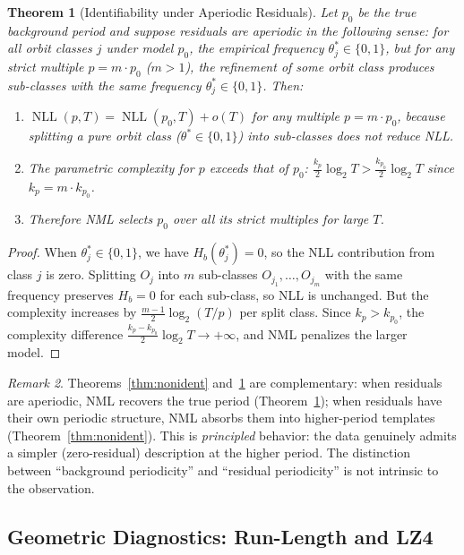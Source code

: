 \documentclass[11pt]{article}
\newtheorem{theorem}{Theorem}
\theoremstyle{definition}
\theoremstyle{remark}
\newtheorem{remark}[theorem]{Remark}
\newcommand{\NLL}{\operatorname{NLL}}
\newcommand{\Hb}{H_b}
\begin{document}
\begin{theorem}[Identifiability under Aperiodic Residuals]\label{thm:ident}
Let $p_0$ be the true background period and suppose residuals are aperiodic in the following sense: for all orbit classes $j$ under model $p_0$, the empirical frequency $\theta_j^* \in \{0, 1\}$, but for any strict multiple $p = m \cdot p_0$ ($m > 1$), the refinement of some orbit class produces sub-classes with the same frequency $\theta_j^* \in \{0, 1\}$.
Then:
\begin{enumerate}
    \item[\textup{(i)}] $\NLL(p, T) = \NLL(p_0, T) + o(T)$ for any multiple $p = m \cdot p_0$, because splitting a pure orbit class ($\theta^* \in \{0,1\}$) into sub-classes does not reduce NLL.
    \item[\textup{(ii)}] The parametric complexity for $p$ exceeds that of $p_0$: $\frac{k_p}{2}\log_2 T > \frac{k_{p_0}}{2}\log_2 T$ since $k_p = m \cdot k_{p_0}$.
    \item[\textup{(iii)}] Therefore NML selects $p_0$ over all its strict multiples for large $T$.
\end{enumerate}
\end{theorem}

\begin{proof}
When $\theta_j^* \in \{0,1\}$, we have $\Hb(\theta_j^*) = 0$, so the NLL contribution from class $j$ is zero.
Splitting $O_j$ into $m$ sub-classes $O_{j_1}, \ldots, O_{j_m}$ with the same frequency preserves $\Hb = 0$ for each sub-class, so NLL is unchanged.
But the complexity increases by $\frac{m-1}{2}\log_2(T/p)$ per split class.
Since $k_p > k_{p_0}$, the complexity difference $\frac{k_p - k_{p_0}}{2}\log_2 T \to +\infty$, and NML penalizes the larger model.
\end{proof}

\begin{remark}
Theorems~\ref{thm:nonident} and~\ref{thm:ident} are complementary: when residuals are aperiodic, NML recovers the true period (Theorem~\ref{thm:ident}); when residuals have their own periodic structure, NML absorbs them into higher-period templates (Theorem~\ref{thm:nonident}).
This is \emph{principled} behavior: the data genuinely admits a simpler (zero-residual) description at the higher period.
The distinction between ``background periodicity'' and ``residual periodicity'' is not intrinsic to the observation.
\end{remark}

\subsection{Geometric Diagnostics: Run-Length and LZ4}
\end{document}
